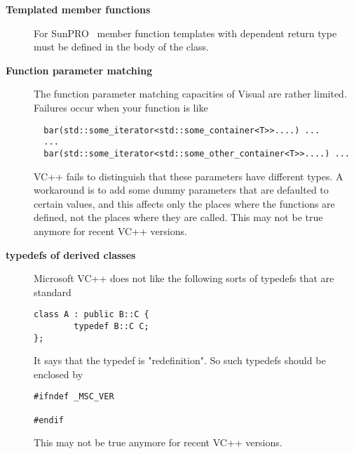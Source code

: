 \begin{description}
\item[\textbf{Templated member functions}]

For SunPRO \CC\, member function templates with dependent return type
must be defined in the body of the class. 

\item[\textbf{Function parameter matching}]

The function parameter matching capacities of Visual \CC are rather limited. 
Failures occur when your function  is like
\begin{verbatim}
  bar(std::some_iterator<std::some_container<T>>....) ...
  ...
  bar(std::some_iterator<std::some_other_container<T>>....) ...
\end{verbatim}
VC++ fails to distinguish that these parameters have different types.
A workaround is to add some dummy parameters that are defaulted to
certain values, and this affects only the places where the functions
are defined, not the places where they are called.
This may not be true anymore for recent VC++ versions.

\item[\textbf{typedefs of derived classes}]
Microsoft VC++ does not like the following sorts of typedefs that are 
standard
\begin{verbatim}
class A : public B::C {
        typedef B::C C;
};
\end{verbatim}
It says that the typedef is "redefinition".  So such typedefs should be 
enclosed by
\begin{verbatim}
#ifndef _MSC_VER

#endif
\end{verbatim}
This may not be true anymore for recent VC++ versions.
\end{description}





